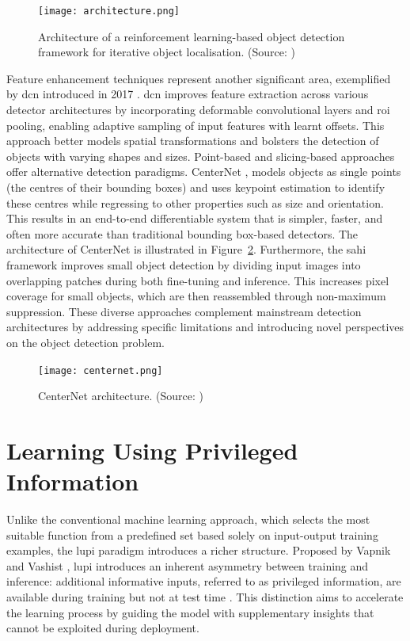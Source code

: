 \begin{figure}[!htbp]
\centering
\texttt{[image: architecture.png]}
\caption{Architecture of a reinforcement learning-based object detection framework for iterative object localisation. (Source: \cite{bartolo2024integratingsaliencyrankingreinforcement})}
\label{fig:sarlvision}
\end{figure}

Feature enhancement techniques represent another significant area, exemplified by \gls{dcn} introduced in 2017 \cite{dcn}. \gls{dcn} improves feature extraction across various detector architectures by incorporating deformable convolutional layers and \gls{roi} pooling, enabling adaptive sampling of input features with learnt offsets. This approach better models spatial transformations and bolsters the detection of objects with varying shapes and sizes.
Point-based and slicing-based approaches offer alternative detection paradigms. CenterNet \cite{centernet}, models objects as single points (the centres of their bounding boxes) and uses keypoint estimation to identify these centres while regressing to other properties such as size and orientation. This results in an end-to-end differentiable system that is simpler, faster, and often more accurate than traditional bounding box-based detectors. The architecture of CenterNet is illustrated in Figure~\ref{fig:centernet}. Furthermore, the \gls{sahi} framework \cite{sahi_detection} improves small object detection by dividing input images into overlapping patches during both fine-tuning and inference. This increases pixel coverage for small objects, which are then reassembled through non-maximum suppression.
These diverse approaches complement mainstream detection architectures by addressing specific limitations and introducing novel perspectives on the object detection problem.

\begin{figure}[!htbp]
\centering
\texttt{[image: centernet.png]}
\caption{CenterNet architecture. (Source: \cite{centernet})}
\label{fig:centernet}
\end{figure}

\section{Learning Using Privileged Information}
\label{subsec:2_lupi_background}

Unlike the conventional machine learning approach, which selects the most suitable function from a predefined set based solely on input-output training examples, the \gls{lupi} paradigm introduces a richer structure. Proposed by Vapnik and Vashist \cite{lupi, Vapnik2015LearningUP}, \gls{lupi} introduces an inherent asymmetry between training and inference: additional informative inputs, referred to as privileged information, are available during training but not at test time \cite{lab2wild, lupi_classification}. This distinction aims to accelerate the learning process by guiding the model with supplementary insights that cannot be exploited during deployment.

